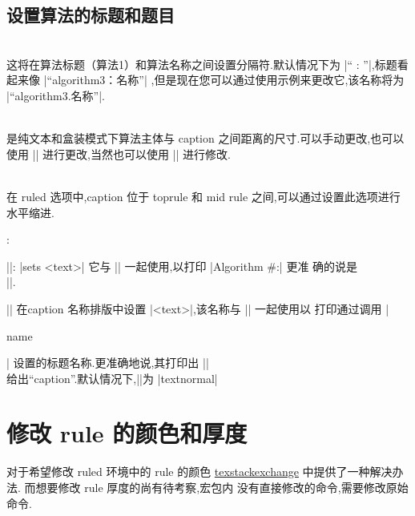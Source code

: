 \subsection{设置算法的标题和题目}
	\noindent \cprotect {} \\
	这将在算法标题（算法1）和算法名称之间设置分隔符.默认情况下为  |“ : ”|,标题看起来像
	 |“algorithm3：名称”| ,但是现在您可以通过使用示例来更改它,该名称将为  
	 |“algorithm3.名称”|.
	 
	 \noindent \cprotect \fbox{|\AlCapSkip{}|} \\
	 是纯文本和盒装模式下算法主体与 caption 之间距离的尺寸.可以手动更改,也可以使用
	 |\SetAlCapSkip {0ex}| 进行更改,当然也可以使用 || 进行修改.
	 
	\noindent \cprotect {}\\
	在 ruled 选项中,caption 位于 toprule 和 mid rule 之间,可以通过设置此选项进行水平缩进.
	
	:  
	\begin{description}
		\item||: |sets <text>| 它与 |\AlCapFnt| 一起使用,以打印 |Algorithm #:| 更准
		确的说是\\ ||.
		\item  	||  在caption 名称排版中设置 |<text>|,该名称与 
		|\AlCapNameFnt| 一起使用以	打印通过调用  |\caption {name}| 
		设置的标题名称.更准确地说,其打印出
		||\\
		给出“caption”.默认情况下,|\AlCapNameSty|为 	|textnormal|
	\end{description}
	
\section{修改 rule 的颜色和厚度}
对于希望修改 ruled 环境中的 rule 的颜色
\href{https://tex.stackexchange.com/questions/298340/colored-horizontal-lines-in-algorithm2e/298346
#298346}{texstackexchange} 中提供了一种解决办法.  而想要修改 rule 厚度的尚有待考察,宏包内
没有直接修改的命令,需要修改原始命令.

